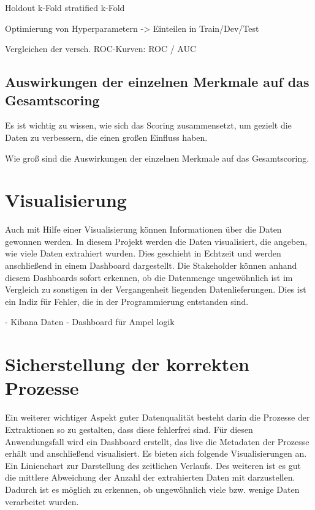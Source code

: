 Holdout
k-Fold
stratified k-Fold

Optimierung von Hyperparametern 
-> Einteilen in Train/Dev/Test

Vergleichen der versch. ROC-Kurven:
ROC / AUC

\subsection{Auswirkungen der einzelnen Merkmale auf das Gesamtscoring}
Es ist wichtig zu wissen, wie sich das Scoring zusammensetzt, um gezielt die Daten zu verbessern, die einen großen Einfluss haben. 

Wie groß sind die Auswirkungen der einzelnen Merkmale auf das Gesamtscoring. 

\section{Visualisierung}
Auch mit Hilfe einer Visualisierung können Informationen über die Daten gewonnen werden.
In diesem Projekt werden die Daten visualisiert, die angeben, wie viele Daten extrahiert wurden.
Dies geschieht in Echtzeit und werden anschließend in einem Dashboard dargestellt.
Die Stakeholder können anhand diesem Dashboards sofort erkennen, ob die Datenmenge ungewöhnlich ist im Vergleich zu sonstigen in der Vergangenheit liegenden Datenlieferungen.
Dies ist ein Indiz für Fehler, die in der Programmierung entstanden sind.



- Kibana Daten
- Dashboard für Ampel logik

\section{Sicherstellung der korrekten Prozesse}
Ein weiterer wichtiger Aspekt guter Datenqualität besteht darin die Prozesse der Extraktionen so zu gestalten, dass diese fehlerfrei sind.
Für diesen Anwendungsfall wird ein Dashboard erstellt, das live die Metadaten der Prozesse erhält und anschließend visualisiert.
Es bieten sich folgende Visualisierungen an.
Ein Linienchart zur Darstellung des zeitlichen Verlaufs.
Des weiteren ist es gut die mittlere Abweichung der Anzahl der extrahierten Daten mit darzustellen. 
Dadurch ist es möglich zu erkennen, ob ungewöhnlich viele bzw. wenige Daten verarbeitet wurden. 


